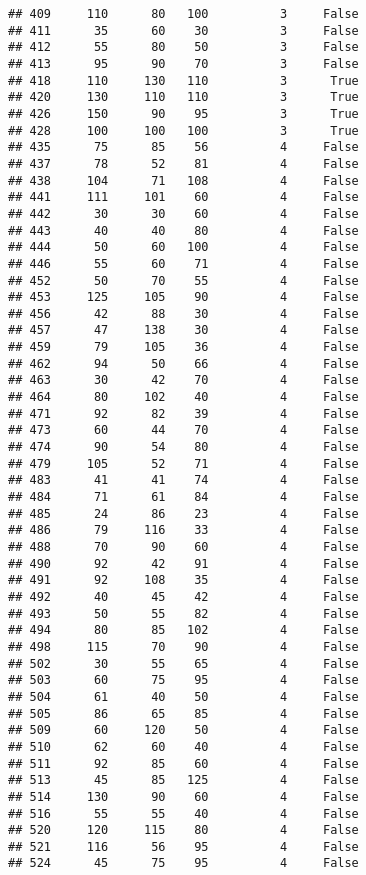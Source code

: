 \documentclass[
]{article}
\begin{document}
\begin{verbatim}
## 409     110      80   100          3     False
## 411      35      60    30          3     False
## 412      55      80    50          3     False
## 413      95      90    70          3     False
## 418     110     130   110          3      True
## 420     130     110   110          3      True
## 426     150      90    95          3      True
## 428     100     100   100          3      True
## 435      75      85    56          4     False
## 437      78      52    81          4     False
## 438     104      71   108          4     False
## 441     111     101    60          4     False
## 442      30      30    60          4     False
## 443      40      40    80          4     False
## 444      50      60   100          4     False
## 446      55      60    71          4     False
## 452      50      70    55          4     False
## 453     125     105    90          4     False
## 456      42      88    30          4     False
## 457      47     138    30          4     False
## 459      79     105    36          4     False
## 462      94      50    66          4     False
## 463      30      42    70          4     False
## 464      80     102    40          4     False
## 471      92      82    39          4     False
## 473      60      44    70          4     False
## 474      90      54    80          4     False
## 479     105      52    71          4     False
## 483      41      41    74          4     False
## 484      71      61    84          4     False
## 485      24      86    23          4     False
## 486      79     116    33          4     False
## 488      70      90    60          4     False
## 490      92      42    91          4     False
## 491      92     108    35          4     False
## 492      40      45    42          4     False
## 493      50      55    82          4     False
## 494      80      85   102          4     False
## 498     115      70    90          4     False
## 502      30      55    65          4     False
## 503      60      75    95          4     False
## 504      61      40    50          4     False
## 505      86      65    85          4     False
## 509      60     120    50          4     False
## 510      62      60    40          4     False
## 511      92      85    60          4     False
## 513      45      85   125          4     False
## 514     130      90    60          4     False
## 516      55      55    40          4     False
## 520     120     115    80          4     False
## 521     116      56    95          4     False
## 524      45      75    95          4     False

\end{verbatim}
\end{document}
